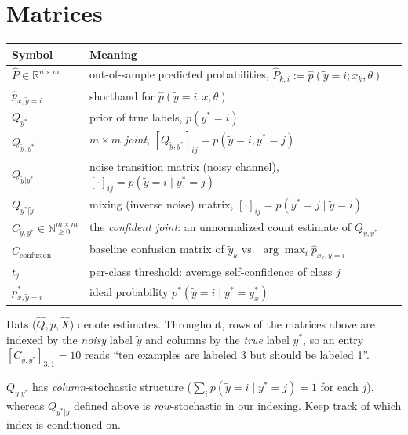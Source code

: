 \documentclass[11pt,a4paper]{report}
\newcommand{\R}{\mathbb{R}}
\newcommand{\N}{\mathbb{N}}
\newcommand{\1}{\mathbf 1}
\theoremstyle{definition}
\theoremstyle{plain}
\theoremstyle{remark}
\begin{document}
\section{Matrices}
\begin{center}
\small
\renewcommand{\arraystretch}{1.25}
\begin{tabular}{@{}p{3.3cm}p{10.6cm}@{}}
\toprule
\textbf{Symbol} & \textbf{Meaning}\\
\midrule
$\hat P\in\R^{n\times m}$ & out-of-sample predicted probabilities, $\hat P_{k,i}:=\hat p(\tilde y=i;x_k,\theta)$\\
$\hat p_{x,\tilde y=i}$ & shorthand for $\hat p(\tilde y=i;x,\theta)$\\
$Q_{y^*}$ & prior of true labels, $p(y^*=i)$\\
$Q_{\tilde y,y^*}$ & $m\times m$ \emph{joint}, $[Q_{\tilde y,y^*}]_{ij}=p(\tilde y=i,y^*=j)$\\
$Q_{\tilde y|y^*}$ & noise transition matrix (noisy channel), $[\cdot]_{ij}=p(\tilde y=i\mid y^*=j)$\\
$Q_{y^*|\tilde y}$ & mixing (inverse noise) matrix, $[\cdot]_{ij}=p(y^*=j\mid\tilde y=i)$\\
$C_{\tilde y,y^*}\in\N_{\ge0}^{m\times m}$ & the \emph{confident joint}: an unnormalized count estimate of $Q_{\tilde y,y^*}$\\
$C_{\text{confusion}}$ & baseline confusion matrix of $\tilde y_k$ vs.\ $\arg\max_i \hat p_{x_k,\tilde y=i}$\\
$t_j$ & per-class threshold: average self-confidence of class $j$\\
$p^*_{x,\tilde y=i}$ & ideal probability $p^*(\tilde y=i\mid y^*=y^*_x)$\\
\bottomrule
\end{tabular}
\end{center}
Hats ($\hat Q,\hat p,\hat X$) denote estimates. Throughout, rows of the matrices above are indexed by the \emph{noisy} label $\tilde y$ and columns by the \emph{true} label $y^*$, so an entry $[C_{\tilde y,y^*}]_{3,1}=10$ reads ``ten examples are labeled 3 but should be labeled 1''.

\begin{pitfall}
$Q_{\tilde y|y^*}$ has \emph{column}-stochastic structure ($\sum_i p(\tilde y=i\mid y^*=j)=1$ for each $j$), whereas $Q_{y^*|\tilde y}$ defined above is \emph{row}-stochastic in our indexing. Keep track of which index is conditioned on.
\end{pitfall}
\end{document}

